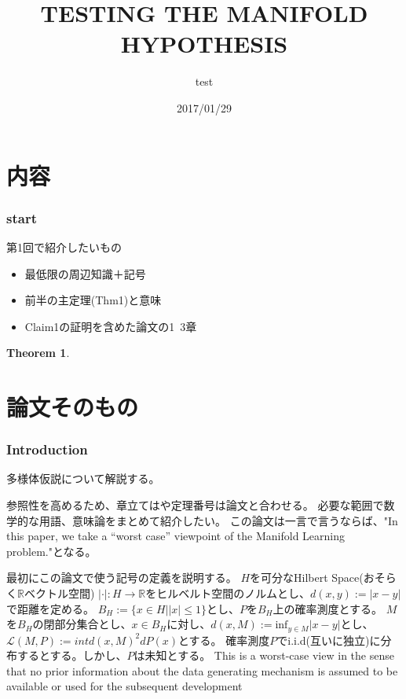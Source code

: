 \documentclass{ujarticle}
\title{TESTING THE MANIFOLD HYPOTHESIS}
\author{test}
\date{2017/01/29}
\newtheorem{thm}{Theorem}[section]
\begin{document}
\part{内容}

\section{start}
\label{start}
第1回で紹介したいもの
\begin{itemize}
  \item 最低限の周辺知識＋記号
  \item 前半の主定理(Thm1)と意味
  \item Claim1の証明を含めた論文の1~3章
\end{itemize}



\begin{thm}

\end{thm}


\part{論文そのもの}




\setcounter{section}{0}
\section{Introduction}
\label{sec:Introduction}
多様体仮説について解説する。

参照性を高めるため、章立てはや定理番号は論文と合わせる。
必要な範囲で数学的な用語、意味論をまとめて紹介したい。
この論文は一言で言うならば、"In this paper, we take a “worst case” viewpoint of the Manifold Learning problem."となる。

最初にこの論文で使う記号の定義を説明する。
$H$を可分なHilbert Space(おそらく$\mathbb{R}$ベクトル空間)
$| \cdot |:H \to \mathbb{R}$をヒルベルト空間のノルムとし、$d(x,y):=|x-y|$で距離を定める。
$B_H:=\{x \in H| |x| \le 1\}$とし、$P$を$B_H$上の確率測度とする。
$M$を$B_H$の閉部分集合とし、$x \in B_H$に対し、$d(x,M):=\mathrm{inf}_{y \in M}|x -y |$とし、
$\mathcal{L}(M,P):=int d(x,M)^2 dP(x)$とする。
確率測度$P$でi.i.d(互いに独立)に分布するとする。しかし、$P$は未知とする。
This is a worst-case view in the sense that no prior information
about the data generating mechanism is assumed to be available or used for the subsequent development
\end{document}
